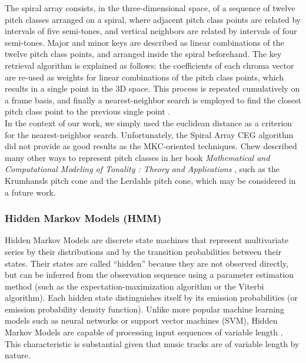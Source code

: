 \documentclass[letterpaper]{article}
\begin{document}
The spiral array consists, in the three-dimensional space, of a sequence of twelve pitch classes arranged on a spiral, where adjacent pitch class points are related by intervals of five semi-tones, and vertical neighbors are related by intervals of four semi-tones. Major and minor keys are described as linear combinations of the twelve pitch class points, and arranged inside the spiral beforehand. The key retrieval algorithm is explained as follows: the coefficients of each chroma vector are re-used as weights for linear combinations of the pitch class points, which results in a single point in the 3D space. This process is repeated cumulatively on a frame basis, and finally a nearest-neighbor search is employed to find the closest pitch class point to the previous single point \citep{MIDI}.\\

In the context of our work, we simply used the euclidean distance as a criterion for the nearest-neighbor search. Unfortunately, the Spiral Array CEG algorithm did not provide as good results as the MKC-oriented techniques. Chew described many other ways to represent pitch classes in her book \textit{Mathematical and Computational Modeling of Tonality : Theory and Applications} \citep{CHEW}, such as the Krumhansl\textquotesingle s pitch cone and the Lerdahl\textquotesingle s pitch cone, which may be considered in a future work.

\subsubsection{Hidden Markov Models (HMM)}
\label{sssec:hmm}

Hidden Markov Models are discrete state machines that represent multivariate series by their distributions and by
the transition probabilities between their states. Their states are called “hidden” because they are not observed directly,
but can be inferred from the observation sequence using a parameter estimation method (such as the expectation-maximization algorithm
or the Viterbi algorithm). Each hidden state distinguishes itself by its emission probabilities (or emission probability density function).
Unlike more popular machine learning models such as neural networks or support vector machines (SVM), Hidden Markov Models are capable of
processing input sequences of variable length \citep{DR}. This characteristic is substantial given that music tracks are of variable length by nature. \\
\end{document}
